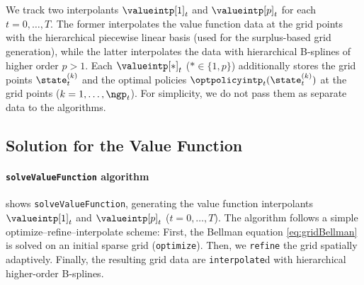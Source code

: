 We track two interpolants $\valueintp[1]_t$ and $\valueintp[p]_t$
for each $t = 0, \dotsc, T$.
The former interpolates the value function data at the grid points
with the hierarchical piecewise linear basis
(used for the surplus-based grid generation),
while the latter interpolates the data with hierarchical B-splines
of higher order $p > 1$.
Each $\valueintp[\ast]_t$ ($\ast \in \{1, p\}$)
additionally stores the grid points $\state_t^{(k)}$
and the optimal policies $\optpolicyintp_t(\state_t^{(k)})$
at the grid points ($k = 1, \dotsc, \ngp_t$).
For simplicity, we do not pass them as separate data
to the algorithms.



\subsection{Solution for the Value Function}
\label{sec:822solveValueFunction}

\paragraph{\texttt{solveValueFunction} algorithm}

 shows \texttt{solveValueFunction},
generating the value function interpolants
$\valueintp[1]_t$ and $\valueintp[p]_t$ ($t = 0, \dotsc, T$).
The algorithm follows a simple optimize--refine--interpolate scheme:
First, the Bellman equation \eqref{eq:gridBellman} is solved
on an initial sparse grid (\texttt{optimize}).
Then, we \texttt{refine} the grid spatially adaptively.
Finally, the resulting grid data are \texttt{interpolate}d
with hierarchical higher-order B-splines.

\begin{algorithm}
  \begin{algorithmic}[1]
      \EndFor{}
    \EndFunction{}
  \end{algorithmic}
  \caption[%
    Generation of value function interpolants (\texttt{solveValueFunction})%
  ]{%
    Generation of value function interpolants.
    Outputs are the piecewise linear interpolants $\valueintp[1]_t$
    and the higher-order B-spline interpolants $\valueintp[p]_t$
    for all $t = 0, \dotsc, T$.%
  }%
  \label{alg:financeSolveValueFunction}%
\end{algorithm}

